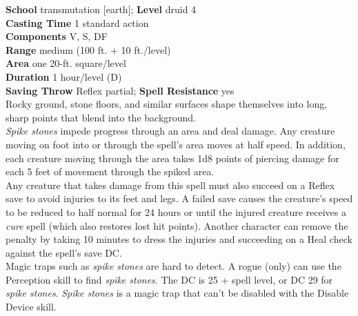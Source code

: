 \textbf{School} transmutation [earth]; \textbf{Level} druid 4\\
\textbf{Casting Time} 1 standard action\\
\textbf{Components} V, S, DF\\
\textbf{Range }medium (100 ft. + 10 ft./level)\\
\textbf{Area} one 20-ft. square/level\\
\textbf{Duration} 1 hour/level (D)\\
\textbf{Saving Throw} Reflex partial; \textbf{Spell Resistance} yes\\
Rocky ground, stone floors, and similar surfaces shape themselves into long, sharp points that blend into the background.\\
\textit{Spike stones }impede progress through an area and deal damage. Any creature moving on foot into or through the spell's area moves at half speed. In addition, each creature moving through the area takes 1d8 points of piercing damage for each 5 feet of movement through the spiked area.\\
Any creature that takes damage from this spell must also succeed on a Reflex save to avoid injuries to its feet and legs. A failed save causes the creature's speed to be reduced to half normal for 24 hours or until the injured creature receives a \textit{cure }spell (which also restores lost hit points). Another character can remove the penalty by taking 10 minutes to dress the injuries and succeeding on a Heal check against the spell's save DC.\\
Magic traps such as \textit{spike stones }are hard to detect. A rogue (only) can use the Perception skill to find \textit{spike stones}. The DC is 25 + spell level, or DC 29 for \textit{spike stones}.\textit{ Spike stones }is a magic trap that can't be disabled with the Disable Device skill.\\

